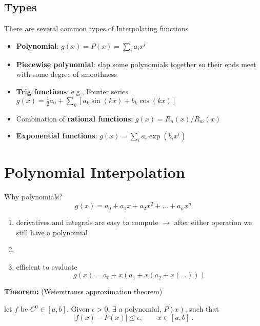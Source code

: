 \documentclass[12pt]{exam}
\begin{document}
\subsection*{Types}
There are several common types of Interpolating functions
%
\begin{itemize}
\item \textbf{Polynomial}: $g(x) = P(x) = \sum_i a_i x^i$

\item \textbf{Piecewise polynomial}: slap some polynomials together so their ends meet with some degree of smoothness

\item \textbf{Trig functions}: e.g., Fourier series $g(x) = \frac{1}{2} a_0 + \sum_k [a_k \sin(kx) + b_k \cos(kx)]$ %

\item Combination of \textbf{rational functions}: $g(x) = R_n(x)/R_m(x)$

\item \textbf{Exponential functions}: $g(x) = \sum_i a_i \exp(b_i x^i)$
\end{itemize}


\section*{Polynomial Interpolation}
Why polynomials?
\[g(x) = a_0 + a_1 x + a_2 x^2 + \dots +a_n x^n\]

\begin{enumerate}
\ifprintanswers
\item derivatives and integrals are easy to compute $\rightarrow$ after either operation we still have a polynomial
\else
\item
\fi
\item efficient to evaluate
\[g(x) = a_0 + x(a_1 + x(a_2 + x(\dots)))\]
\end{enumerate}

\textbf{Theorem:} (Weierstrauss approximation theorem)

let $f$ be $C^0 \in [a,b]$. Given $\epsilon > 0$, $\exists$ a polynomial, $P(x)$, such that 
\ifprintanswers
\[|f(x) - P(x)| \leq \epsilon, \qquad x \in [a,b] \:.\]
\else
\vspace*{2em}
\fi
\end{document}
